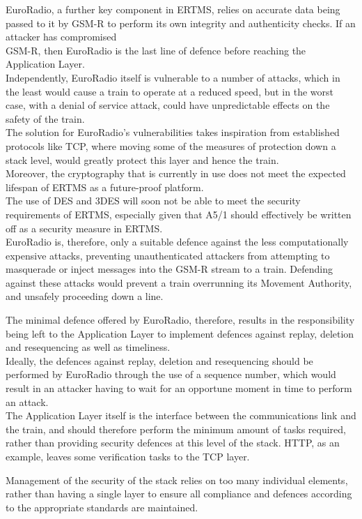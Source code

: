 \documentclass[twoside,11pt,a4paper]{article}
\begin{document}
EuroRadio, a further key component in ERTMS, relies on accurate data being passed to it by GSM-R to perform its own integrity and authenticity checks. If an attacker has compromised\\GSM-R, then EuroRadio is the last line of defence before reaching the Application Layer.\\Independently, EuroRadio itself is vulnerable to a number of attacks, which in the least would cause a train to operate at a reduced speed, but in the worst case, with a denial of service attack, could have unpredictable effects on the safety of the train.\\The solution for EuroRadio's vulnerabilities takes inspiration from established protocols like TCP, where moving some of the measures of protection down a stack level, would greatly protect this layer and hence the train.\\Moreover, the cryptography that is currently in use does not meet the expected lifespan of ERTMS as a future-proof platform.\\The use of DES and 3DES will soon not be able to meet the security requirements of ERTMS, especially given that A5/1 should effectively be written off as a security measure in ERTMS.\\EuroRadio is, therefore, only a suitable defence against the less computationally expensive attacks, preventing unauthenticated attackers from attempting to masquerade or inject messages into the GSM-R stream to a train. Defending against these attacks would prevent a train overrunning its Movement Authority, and unsafely proceeding down a line.

The minimal defence offered by EuroRadio, therefore, results in the responsibility being left to the Application Layer to implement defences against replay, deletion and resequencing as well as timeliness.\\ Ideally, the defences against replay, deletion and resequencing should be performed by EuroRadio through the use of a sequence number, which would result in an attacker having to wait for an opportune moment in time to perform an attack.\\The Application Layer itself is the interface between the communications link and the train, and should therefore perform the minimum amount of tasks required, rather than providing security defences at this level of the stack. HTTP, as an example, leaves some verification tasks to the TCP layer.

Management of the security of the stack relies on too many individual elements, rather than having a single layer to ensure all compliance and defences according to the appropriate standards are maintained.
\end{document}

